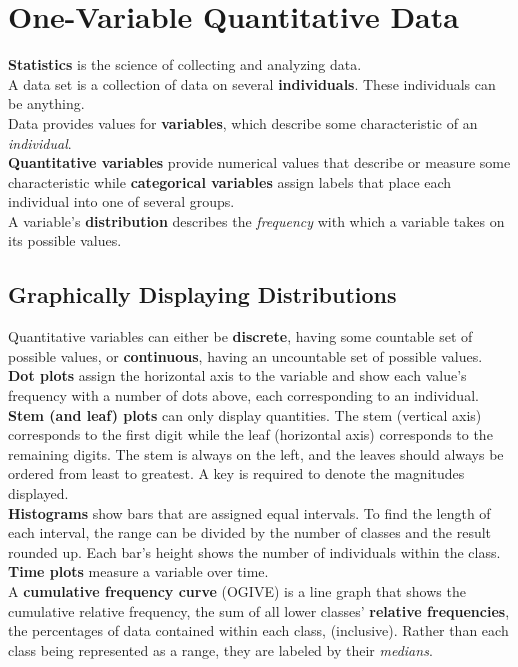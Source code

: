 \documentclass[../AP_Statistics.tex]{subfiles}
\begin{document}
	\chapter{One-Variable Quantitative Data}
		\textbf{Statistics} is the science of collecting and analyzing data. \\
		A data set is a collection of data on several \textbf{individuals}. These individuals can be anything. \\
		Data provides values for \textbf{variables}, which describe some characteristic of an \emph{individual}. \\
		\textbf{Quantitative variables} provide numerical values that describe or measure some characteristic while \textbf{categorical variables} assign labels that place each individual into one of several groups. \\
		A variable's \textbf{distribution} describes the \emph{frequency} with which a variable takes on its possible values.
		\section{Graphically Displaying Distributions}
			Quantitative variables can either be \textbf{discrete}, having some countable set of possible values, or \textbf{continuous}, having an uncountable set of possible values.
			\textbf{Dot plots} assign the horizontal axis to the variable and show each value's frequency with a number of dots above, each corresponding to an individual. \\
			\textbf{Stem (and leaf) plots} can only display quantities. The stem (vertical axis) corresponds to the first digit while the leaf (horizontal axis) corresponds to the remaining digits. The stem is always on the left, and the leaves should always be ordered from least to greatest. A key is required to denote the magnitudes displayed. \\
			\textbf{Histograms} show bars that are assigned equal intervals. To find the length of each interval, the range can be divided by the number of classes and the result rounded up. Each bar's height shows the number of individuals within the class. \\
			\textbf{Time plots} measure a variable over time. \\
			A \textbf{cumulative frequency curve} (OGIVE) is a line graph that shows the cumulative relative frequency, the sum of all lower classes' \textbf{relative frequencies}, the percentages of data contained within each class, (inclusive). Rather than each class being represented as a range, they are labeled by their \emph{medians}.
\end{document}

